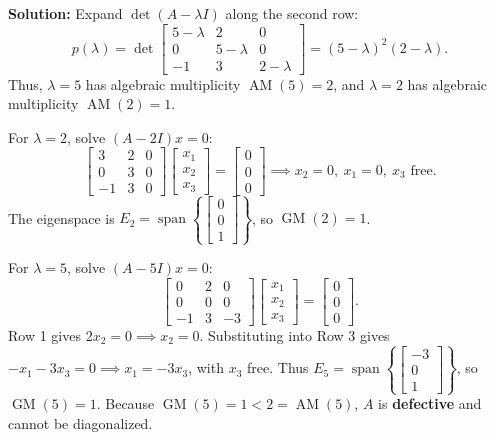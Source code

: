 \documentclass[11pt, letterpaper]{article}
\theoremstyle{definition}
\theoremstyle{remark}
\begin{document}
\textbf{Solution:} Expand $\det(A - \lambda I)$ along the second row:
\[
p(\lambda) = \det\begin{bmatrix} 5 - \lambda & 2 & 0 \\ 0 & 5 - \lambda & 0 \\ -1 & 3 & 2 - \lambda \end{bmatrix} = (5 - \lambda)^2(2 - \lambda).
\]
Thus, $\lambda = 5$ has algebraic multiplicity $\operatorname{AM}(5) = 2$, and $\lambda = 2$ has algebraic multiplicity $\operatorname{AM}(2) = 1$.

For $\lambda = 2$, solve $(A - 2I)x = 0$:
\[
\begin{bmatrix} 3 & 2 & 0 \\ 0 & 3 & 0 \\ -1 & 3 & 0 \end{bmatrix}\begin{bmatrix} x_1 \\ x_2 \\ x_3 \end{bmatrix} = \begin{bmatrix} 0 \\ 0 \\ 0 \end{bmatrix} \implies x_2 = 0,\ x_1 = 0,\ x_3 \text{ free}.
\]
The eigenspace is $E_2 = \operatorname{span}\left\{\begin{bmatrix} 0 \\ 0 \\ 1 \end{bmatrix}\right\}$, so $\operatorname{GM}(2) = 1$.

For $\lambda = 5$, solve $(A - 5I)x = 0$:
\[
\begin{bmatrix} 0 & 2 & 0 \\ 0 & 0 & 0 \\ -1 & 3 & -3 \end{bmatrix}\begin{bmatrix} x_1 \\ x_2 \\ x_3 \end{bmatrix} = \begin{bmatrix} 0 \\ 0 \\ 0 \end{bmatrix}.
\]
Row 1 gives $2x_2 = 0 \implies x_2 = 0$. Substituting into Row 3 gives $-x_1 - 3x_3 = 0 \implies x_1 = -3x_3$, with $x_3$ free. Thus $E_5 = \operatorname{span}\left\{\begin{bmatrix} -3 \\ 0 \\ 1 \end{bmatrix}\right\}$, so $\operatorname{GM}(5) = 1$.
Because $\operatorname{GM}(5) = 1 < 2 = \operatorname{AM}(5)$, $A$ is \textbf{defective} and cannot be diagonalized.
\end{document}
